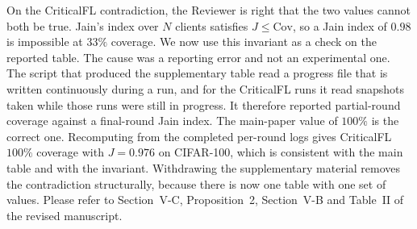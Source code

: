 \documentclass[10pt]{article}
\begin{document}
{On the CriticalFL contradiction, the Reviewer is right that the two values cannot both be true. Jain's index over $N$ clients satisfies $J\le\mathrm{Cov}$, so a Jain index of $0.98$ is impossible at $33\%$ coverage. We now use this invariant as a check on the reported table. The cause was a reporting error and not an experimental one. The script that produced the supplementary table read a progress file that is written continuously during a run, and for the CriticalFL runs it read snapshots taken while those runs were still in progress. It therefore reported partial-round coverage against a final-round Jain index. The main-paper value of $100\%$ is the correct one. Recomputing from the completed per-round logs gives CriticalFL $100\%$ coverage with $J=0.976$ on CIFAR-100, which is consistent with the main table and with the invariant. Withdrawing the supplementary material removes the contradiction structurally, because there is now one table with one set of values. Please refer to Section~V-C, Proposition~2, Section~V-B and Table~II of the revised manuscript.}\\
\end{document}

